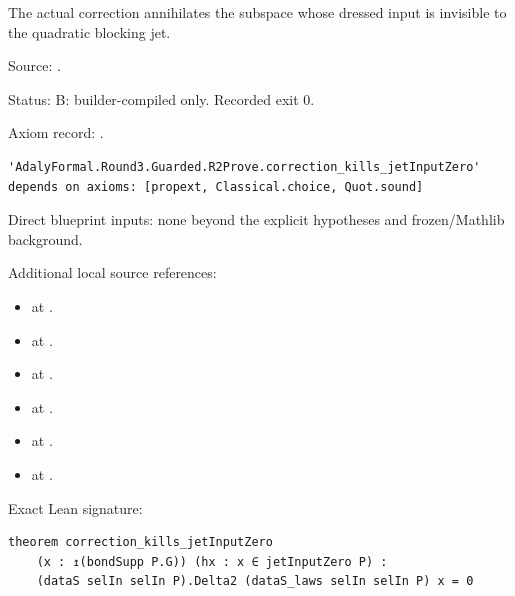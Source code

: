 \begin{theorem}[bp-040]
\label{bp-040}
\uses{}
\leanok
The actual correction annihilates the subspace whose dressed input is invisible to the quadratic blocking jet.

\par Source: \texttt{}.
\par Status: B: builder-compiled only. Recorded exit 0.
\par Axiom record: \texttt{}.
\begin{verbatim}
'AdalyFormal.Round3.Guarded.R2Prove.correction_kills_jetInputZero' depends on axioms: [propext, Classical.choice, Quot.sound]
\end{verbatim}
\par Direct blueprint inputs: none beyond the explicit hypotheses and frozen/Mathlib background.
\par Additional local source references:
\begin{itemize}
\item \texttt{} at \texttt{}.
\item \texttt{} at \texttt{}.
\item \texttt{} at \texttt{}.
\item \texttt{} at \texttt{}.
\item \texttt{} at \texttt{}.
\item \texttt{} at \texttt{}.
\end{itemize}
\par Exact Lean signature:
\begin{verbatim}
theorem correction_kills_jetInputZero
    (x : ↥(bondSupp P.G)) (hx : x ∈ jetInputZero P) :
    (dataS selIn selIn P).Delta2 (dataS_laws selIn selIn P) x = 0
\end{verbatim}
\end{theorem}

